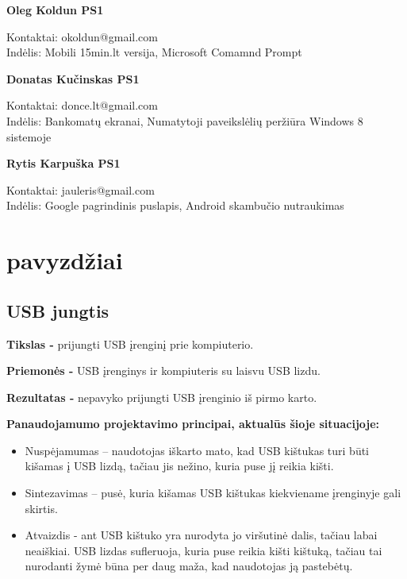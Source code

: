 ﻿\documentclass[a4paper, 12pt]{article}
\newcommand{\OK}{Oleg Koldun PS1}
\newcommand{\RK}{Rytis Karpuška PS1}
\newcommand{\DK}{Donatas Kučinskas PS1}
\begin{document}
		\textbf{\OK}
		\begin{flushleft}
		\hspace*{1.5cm}
		Kontaktai: 
			okoldun@gmail.com 
		\\
		\hspace*{1.5cm}
		Indėlis: Mobili 15min.lt versija, Microsoft Comamnd Prompt
		\end{flushleft}

		\textbf{\DK}
		\begin{flushleft}
		\hspace*{1.5cm}
		Kontaktai: 
			donce.lt@gmail.com 
		\\
		\hspace*{1.5cm}
		Indėlis: Bankomatų ekranai, Numatytoji paveikslėlių peržiūra Windows 8 sistemoje
		\end{flushleft}
		
		\textbf{\RK}
		\begin{flushleft}
		\hspace*{1.5cm}
		Kontaktai: 
			jauleris@gmail.com
		\\
		\hspace*{1.5cm}
		Indėlis: Google pagrindinis puslapis, Android skambučio nutraukimas
		\end{flushleft}
	\newpage{}	
	
	
	\tableofcontents
	\newpage



	
\section{pavyzdžiai}
	\subsection{USB jungtis}
		\textbf{Tikslas -}
		prijungti USB įrenginį prie kompiuterio.

		\textbf{Priemonės -} 
		USB įrenginys ir kompiuteris su laisvu USB lizdu.

		\textbf{Rezultatas -}
		nepavyko prijungti USB įrenginio iš pirmo karto.

		\textbf{Panaudojamumo projektavimo principai, aktualūs šioje situacijoje:}
		\begin{itemize}
		\item Nuspėjamumas – naudotojas iškarto mato, kad USB kištukas turi būti kišamas į USB lizdą, tačiau jis nežino, kuria puse jį reikia kišti.
		\item Sintezavimas – pusė, kuria kišamas USB kištukas kiekviename įrenginyje gali skirtis.
		\item Atvaizdis - ant USB kištuko yra nurodyta jo viršutinė dalis, tačiau labai neaiškiai. USB lizdas sufleruoja, kuria puse reikia kišti kištuką, tačiau tai nurodanti žymė būna per daug maža, kad naudotojas ją pastebėtų.
		\end{itemize}
\end{document}
